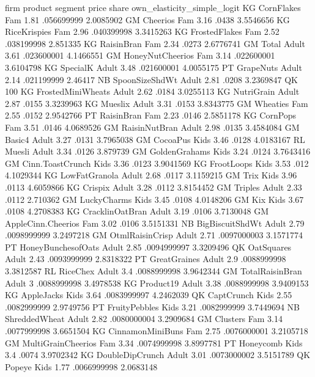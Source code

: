 firm	product	segment	price	share	own_elasticity_simple_logit
KG	CornFlakes	Fam	1.81	.056699999	2.0085902
GM	Cheerios	Fam	3.16	.0438	3.5546656
KG	RiceKrispies	Fam	2.96	.040399998	3.3415263
KG	FrostedFlakes	Fam	2.52	.038199998	2.851335
KG	RaisinBran	Fam	2.34	.0273	2.6776741
GM	Total	Adult	3.61	.023600001	4.1466551
GM	HoneyNutCheerios	Fam	3.14	.022600001	3.6104798
KG	SpecialK	Adult	3.48	.021600001	4.0055175
PT	GrapeNuts	Adult	2.14	.021199999	2.46417
NB	SpoonSizeShdWt	Adult	2.81	.0208	3.2369847
QK	100%
KG	FrostedMiniWheats	Adult	2.62	.0184	3.0255113
KG	NutriGrain	Adult	2.87	.0155	3.3239963
KG	Mueslix	Adult	3.31	.0153	3.8343775
GM	Wheaties	Fam	2.55	.0152	2.9542766
PT	RaisinBran	Fam	2.23	.0146	2.5851178
KG	CornPops	Fam	3.51	.0146	4.0689526
GM	RaisinNutBran	Adult	2.98	.0135	3.4584084
GM	Basic4	Adult	3.27	.0131	3.7965038
GM	CocoaPus	Kids	3.46	.0128	4.0183167
RL	Muesli	Adult	3.34	.0126	3.879739
GM	GoldenGrahams	Kids	3.24	.0124	3.7643416
GM	Cinn.ToastCrunch	Kids	3.36	.0123	3.9041569
KG	FrootLoops	Kids	3.53	.012	4.1029344
KG	LowFatGranola	Adult	2.68	.0117	3.1159215
GM	Trix	Kids	3.96	.0113	4.6059866
KG	Crispix	Adult	3.28	.0112	3.8154452
GM	Triples	Adult	2.33	.0112	2.710362
GM	LuckyCharms	Kids	3.45	.0108	4.0148206
GM	Kix	Kids	3.67	.0108	4.2708383
KG	CracklinOatBran	Adult	3.19	.0106	3.7130048
GM	AppleCinn.Cheerios	Fam	3.02	.0106	3.5151331
NB	BigBiscuitShdWt	Adult	2.79	.0098999999	3.2497218
GM	OtmlRaisinCrisp	Adult	2.71	.0097000003	3.1571774
PT	HoneyBunchesofOats	Adult	2.85	.0094999997	3.3209496
QK	OatSquares	Adult	2.43	.0093999999	2.8318322
PT	GreatGraines	Adult	2.9	.0088999998	3.3812587
RL	RiceChex	Adult	3.4	.0088999998	3.9642344
GM	TotalRaisinBran	Adult	3	.0088999998	3.4978538
KG	Product19	Adult	3.38	.0088999998	3.9409153
KG	AppleJacks	Kids	3.64	.0083999997	4.2462039
QK	CaptCrunch	Kids	2.55	.0082999999	2.9749756
PT	FruityPebbles	Kids	3.21	.0082999999	3.7449694
NB	ShreddedWheat	Adult	2.82	.0080000004	3.2909684
GM	Clusters	Fam	3.14	.0077999998	3.6651504
KG	CinnamonMiniBuns	Fam	2.75	.0076000001	3.2105718
GM	MultiGrainCheerios	Fam	3.34	.0074999998	3.8997781
PT	Honeycomb	Kids	3.4	.0074	3.9702342
KG	DoubleDipCrunch	Adult	3.01	.0073000002	3.5151789
QK	Popeye	Kids	1.77	.0066999998	2.0683148
